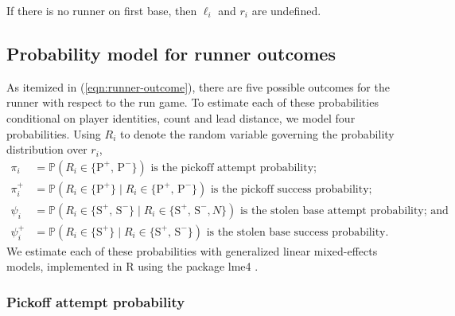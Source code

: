 \documentclass{article}
\begin{document}
    If there is no runner on first base, then $\ell_i$ and $r_i$ are undefined.%

    \subsection{Probability model for runner outcomes}
    \label{sec:prob-runner-outcome}

      As itemized in (\ref{eqn:runner-outcome}), there are five possible outcomes for the runner with respect to the run game. To estimate each of these probabilities conditional on player identities, count and lead distance, we model four probabilities. Using $R_i$ to denote the random variable governing the probability distribution over $r_i$,
      \begin{align*}
        \pi_i    &= \mathbb{P}(R_i \in \{\mbox{P}^+,\, \mbox{P}^-\}) \mbox{ is the pickoff attempt probability;}\\
        \pi_i^+  &= \mathbb{P}(R_i \in \{\mbox{P}^+\} \mid R_i \in \{\mbox{P}^+,\, \mbox{P}^-\}) \mbox{ is the pickoff success probability;}\\
        \psi_i   &= \mathbb{P}(R_i \in \{\mbox{S}^+,\, \mbox{S}^-\} \mid R_i \in \{\mbox{S}^+,\, \mbox{S}^-, N\}) \mbox{ is the stolen base attempt probability; and}\\
        \psi_i^+ &= \mathbb{P}(R_i \in \{\mbox{S}^+\} \mid R_i \in \{\mbox{S}^+,\, \mbox{S}^-\}) \mbox{ is the stolen base success probability.}
      \end{align*}
      We estimate each of these probabilities with generalized linear mixed-effects models, implemented in R using the package lme4 \parencite{bates_fitting_2015}.

      \subsubsection{Pickoff attempt probability}
      \label{sec:prob-po-attempt}
\end{document}
